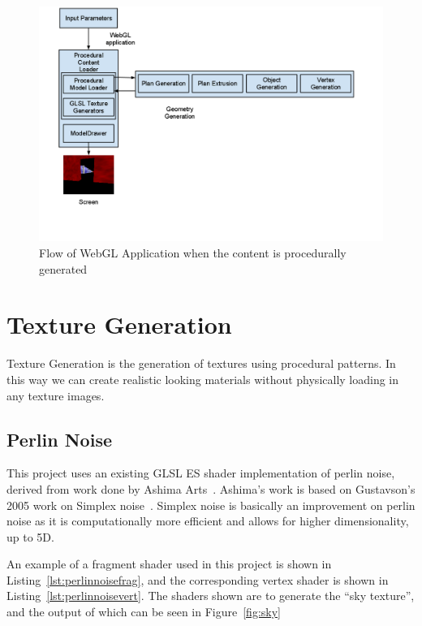 \begin{figure}
  \centering
  \includegraphics[width=1.0\textwidth]{images/gwtproc_procgenflow}
  \caption{Flow of WebGL Application when the content is procedurally generated}
  \label{fig:procgenflow}
\end{figure}

\section{Texture Generation}
\label{sec:texgen}
Texture Generation is the generation of textures using procedural patterns.
In this way we can create realistic looking materials without physically loading in any texture images.

\subsection{Perlin Noise}
\label{sec:implPerlin}
This project uses an existing GLSL ES shader implementation of perlin noise, derived from work done by Ashima Arts~\cite{web:webglnoise}.
Ashima's work is based on Gustavson's 2005 work on Simplex noise~\cite{gustavson2005simplex}.
Simplex noise is basically an improvement on perlin noise as it is computationally more efficient and allows for higher dimensionality, up to 5D.

An example of a fragment shader used in this project is shown in Listing~\ref{lst:perlinnoisefrag}, and the corresponding vertex shader is shown in Listing~\ref{lst:perlinnoisevert}.
The shaders shown are to generate the ``sky texture'', and the output of which can be seen in Figure~\ref{fig:sky}

